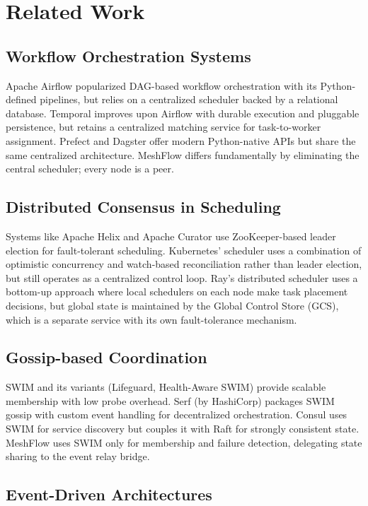 \section{Related Work}

\subsection{Workflow Orchestration Systems}

Apache Airflow popularized DAG-based workflow orchestration with its Python-defined pipelines, but relies on a centralized scheduler backed by a relational database. Temporal improves upon Airflow with durable execution and pluggable persistence, but retains a centralized matching service for task-to-worker assignment. Prefect and Dagster offer modern Python-native APIs but share the same centralized architecture. MeshFlow differs fundamentally by eliminating the central scheduler; every node is a peer.

\subsection{Distributed Consensus in Scheduling}

Systems like Apache Helix and Apache Curator use ZooKeeper-based leader election for fault-tolerant scheduling. Kubernetes' scheduler uses a combination of optimistic concurrency and watch-based reconciliation rather than leader election, but still operates as a centralized control loop. Ray's distributed scheduler uses a bottom-up approach where local schedulers on each node make task placement decisions, but global state is maintained by the Global Control Store (GCS), which is a separate service with its own fault-tolerance mechanism.

\subsection{Gossip-based Coordination}

SWIM and its variants (Lifeguard, Health-Aware SWIM) provide scalable membership with low probe overhead. Serf (by HashiCorp) packages SWIM gossip with custom event handling for decentralized orchestration. Consul uses SWIM for service discovery but couples it with Raft for strongly consistent state. MeshFlow uses SWIM only for membership and failure detection, delegating state sharing to the event relay bridge.

\subsection{Event-Driven Architectures}


